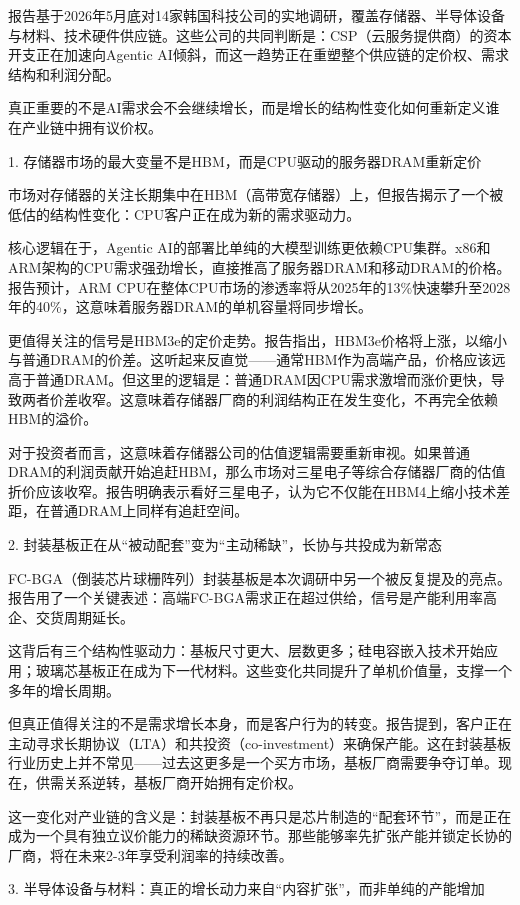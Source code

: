 \documentclass[11pt]{ctexart}
\begin{document}
报告基于2026年5月底对14家韩国科技公司的实地调研，覆盖存储器、半导体设备与材料、技术硬件供应链。这些公司的共同判断是：CSP（云服务提供商）的资本开支正在加速向Agentic AI倾斜，而这一趋势正在重塑整个供应链的定价权、需求结构和利润分配。

真正重要的不是AI需求会不会继续增长，而是增长的结构性变化如何重新定义谁在产业链中拥有议价权。

1. 存储器市场的最大变量不是HBM，而是CPU驱动的服务器DRAM重新定价

市场对存储器的关注长期集中在HBM（高带宽存储器）上，但报告揭示了一个被低估的结构性变化：CPU客户正在成为新的需求驱动力。

核心逻辑在于，Agentic AI的部署比单纯的大模型训练更依赖CPU集群。x86和ARM架构的CPU需求强劲增长，直接推高了服务器DRAM和移动DRAM的价格。报告预计，ARM CPU在整体CPU市场的渗透率将从2025年的13\%快速攀升至2028年的40\%，这意味着服务器DRAM的单机容量将同步增长。

更值得关注的信号是HBM3e的定价走势。报告指出，HBM3e价格将上涨，以缩小与普通DRAM的价差。这听起来反直觉——通常HBM作为高端产品，价格应该远高于普通DRAM。但这里的逻辑是：普通DRAM因CPU需求激增而涨价更快，导致两者价差收窄。这意味着存储器厂商的利润结构正在发生变化，不再完全依赖HBM的溢价。

对于投资者而言，这意味着存储器公司的估值逻辑需要重新审视。如果普通DRAM的利润贡献开始追赶HBM，那么市场对三星电子等综合存储器厂商的估值折价应该收窄。报告明确表示看好三星电子，认为它不仅能在HBM4上缩小技术差距，在普通DRAM上同样有追赶空间。

2. 封装基板正在从“被动配套”变为“主动稀缺”，长协与共投成为新常态

FC-BGA（倒装芯片球栅阵列）封装基板是本次调研中另一个被反复提及的亮点。报告用了一个关键表述：高端FC-BGA需求正在超过供给，信号是产能利用率高企、交货周期延长。

这背后有三个结构性驱动力：基板尺寸更大、层数更多；硅电容嵌入技术开始应用；玻璃芯基板正在成为下一代材料。这些变化共同提升了单机价值量，支撑一个多年的增长周期。

但真正值得关注的不是需求增长本身，而是客户行为的转变。报告提到，客户正在主动寻求长期协议（LTA）和共投资（co-investment）来确保产能。这在封装基板行业历史上并不常见——过去这更多是一个买方市场，基板厂商需要争夺订单。现在，供需关系逆转，基板厂商开始拥有定价权。

这一变化对产业链的含义是：封装基板不再只是芯片制造的“配套环节”，而是正在成为一个具有独立议价能力的稀缺资源环节。那些能够率先扩张产能并锁定长协的厂商，将在未来2-3年享受利润率的持续改善。

3. 半导体设备与材料：真正的增长动力来自“内容扩张”，而非单纯的产能增加
\end{document}
